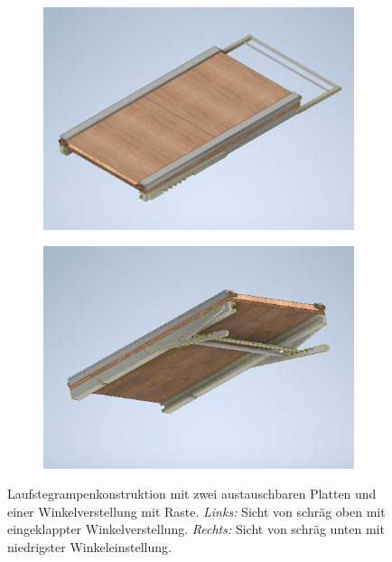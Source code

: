 \begin{figure}[b!]
	\hfill
	\begin{subfigure}[c]{.49\linewidth}
		\centering
		\includegraphics[width=\linewidth]{Bilder/Rampe_oben.png}
	\end{subfigure}
	\begin{subfigure}[c]{.49\linewidth}
		\centering
		\includegraphics[width=\linewidth]{Bilder/Rampe_unten.png}
	\end{subfigure}
	\hfill
	\caption{Laufstegrampenkonstruktion mit zwei austauschbaren Platten und einer Winkelverstellung mit Raste. \textit{Links:} Sicht von schräg oben mit eingeklappter Winkelverstellung. \textit{Rechts:} Sicht von schräg unten mit niedrigster Winkeleinstellung.}
	\label{Rampe_Inventor}
\end{figure}
\FloatBarrier


